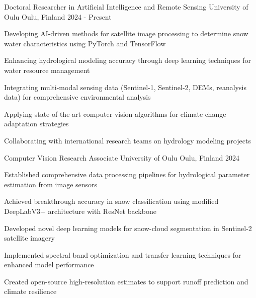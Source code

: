 
\begin{cventries}

  \cventry
    {Doctoral Researcher in Artificial Intelligence and Remote Sensing} %
    {University of Oulu} %
    {Oulu, Finland} %
    {2024 - Present} %
    {
      \begin{cvitems} %
        \item {Developing AI-driven methods for satellite image processing to determine snow water characteristics using PyTorch and TensorFlow}
        \item {Enhancing hydrological modeling accuracy through deep learning techniques for water resource management}
        \item {Integrating multi-modal sensing data (Sentinel-1, Sentinel-2, DEMs, reanalysis data) for comprehensive environmental analysis}
        \item {Applying state-of-the-art computer vision algorithms for climate change adaptation strategies}
        \item {Collaborating with international research teams on hydrology modeling projects}
      \end{cvitems}
    }

  \cventry
    {Computer Vision Research Associate} %
    {University of Oulu} %
    {Oulu, Finland} %
    {2024} %
    {
      \begin{cvitems} %
        \item {Established comprehensive data processing pipelines for hydrological parameter estimation from image sensors}
        \item {Achieved breakthrough accuracy in snow classification using modified DeepLabV3+ architecture with ResNet backbone}
        \item {Developed novel deep learning models for snow-cloud segmentation in Sentinel-2 satellite imagery}
        \item {Implemented spectral band optimization and transfer learning techniques for enhanced model performance}
        \item {Created open-source high-resolution estimates to support runoff prediction and climate resilience}
      \end{cvitems}
    }

\end{cventries}